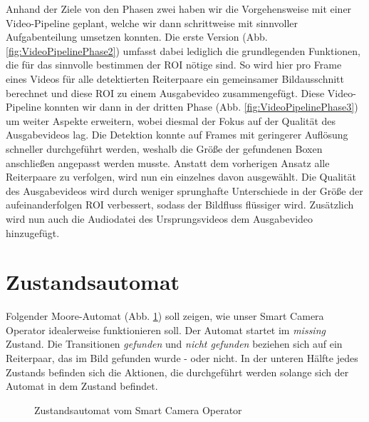 Anhand der Ziele von den Phasen zwei haben wir die Vorgehensweise mit einer Video-Pipeline geplant, welche wir dann schrittweise mit sinnvoller Aufgabenteilung umsetzen konnten. Die erste Version (Abb. \ref{fig:VideoPipelinePhase2}) umfasst dabei lediglich die grundlegenden Funktionen, die für das sinnvolle bestimmen der ROI nötige sind. So wird hier pro Frame eines Videos für alle detektierten Reiterpaare ein gemeinsamer Bildausschnitt berechnet und diese ROI zu einem Ausgabevideo zusammengefügt.
Diese Video-Pipeline konnten wir dann in der dritten Phase (Abb. \ref{fig:VideoPipelinePhase3}) um weiter Aspekte erweitern, wobei diesmal der Fokus auf der Qualität des Ausgabevideos lag. Die Detektion konnte auf Frames mit geringerer Auflösung schneller durchgeführt werden, weshalb die Größe der gefundenen Boxen anschließen angepasst werden musste. Anstatt dem vorherigen Ansatz alle Reiterpaare zu verfolgen, wird nun ein einzelnes davon ausgewählt. Die Qualität des Ausgabevideos wird durch weniger sprunghafte Unterschiede in der Größe der aufeinanderfolgen ROI verbessert, sodass der Bildfluss flüssiger wird. Zusätzlich wird nun auch die Audiodatei des Ursprungsvideos dem Ausgabevideo hinzugefügt.


\section{Zustandsautomat}

Folgender Moore-Automat (Abb. \ref{fig:MoorAutomat}) soll zeigen, wie unser Smart Camera Operator idealerweise funktionieren soll.
Der Automat startet im \emph{missing} Zustand.
Die Transitionen \emph{gefunden} und \emph{nicht gefunden} beziehen sich auf ein Reiterpaar, das im Bild gefunden wurde - oder nicht.
In der unteren Hälfte jedes Zustands befinden sich die Aktionen, die durchgeführt werden solange sich der Automat in dem Zustand befindet.

\begin{figure}[h]
\centering
{}
\caption{Zustandsautomat vom Smart Camera Operator}
\label{fig:MoorAutomat}
\end{figure}
